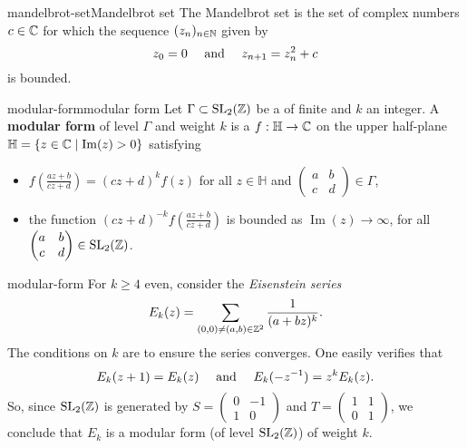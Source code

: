 \begin{topic}{mandelbrot-set}{Mandelbrot set}
    The Mandelbrot set is the set of complex numbers $c \in \mathbb{C}$ for which the sequence $(z_n)_{n \in \mathbb{N}}$ given by
    \[ z_0 = 0 \quad \textup{ and } \quad z_{n + 1} = z_n^2 + c \]
    is bounded.
\end{topic}

\begin{topic}{modular-form}{modular form}
    Let $\Gamma \subset \textup{SL}_2(\mathbb{Z})$ be a  of finite  and $k$ an integer.  A \textbf{modular form} of level $\Gamma$ and weight $k$ is a  $f : \mathbb{H} \to \mathbb{C}$ on the upper half-plane $\mathbb{H} = \{ z \in \mathbb{C} \mid \operatorname{Im}(z) > 0 \}$ satisfying
    \begin{itemize}
        \item $f\left(\frac{az + b}{cz + d}\right) = (cz + d)^k f(z)$ for all $z \in \mathbb{H}$ and $\begin{pmatrix} a & b \\ c & d \end{pmatrix} \in \Gamma$,
        \item the function $(cz + d)^{-k} f\left(\frac{az + b}{cz + d}\right)$ is bounded as $\operatorname{Im}(z) \to \infty$, for all $\begin{pmatrix} a & b \\ c & d \end{pmatrix} \in \textup{SL}_2(\mathbb{Z})$.
    \end{itemize}
\end{topic}

\begin{example}{modular-form}
    For $k \ge 4$ even, consider the \textit{Eisenstein series}
    \[ E_k(z) = \sum_{(0, 0) \ne (a, b) \in \mathbb{Z}^2} \frac{1}{(a + bz)^k} . \]
    The conditions on $k$ are to ensure the series converges. One easily verifies that
    \[ E_k(z + 1) = E_k(z) \quad \textup{ and } \quad E_k(- z^{-1}) = z^k E_k(z) . \]
    So, since $\textup{SL}_2(\mathbb{Z})$ is generated by $S = \begin{pmatrix} 0 & -1 \\ 1 & 0 \end{pmatrix}$ and $T = \begin{pmatrix} 1 & 1 \\ 0 & 1 \end{pmatrix}$, we conclude that $E_k$ is a modular form (of level $\textup{SL}_2(\mathbb{Z})$) of weight $k$.
\end{example}
